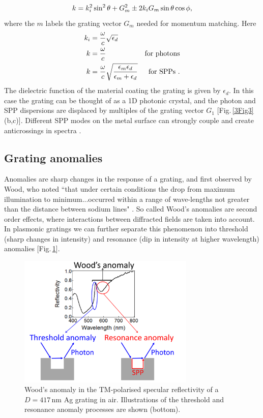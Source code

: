 \begin{equation}
\centering
k = k_i^2\sin^2\theta+G_m^2\pm2k_iG_m\sin\theta\cos\phi ,
\label{GratingDisp}
\end{equation}
where the $m$ labels the grating vector $G_m$ needed for momentum matching. Here
\begin{subequations}
\label{kmodes}
\begin{align}
\centering
k_i &= \frac{\omega}{c}\sqrt{\epsilon_d}& \\
k&=\frac{\omega}{c}& \textnormal{for photons} \label{kphot} \\
k &= \frac{\omega}{c}\sqrt{\frac{\epsilon_m\epsilon_d}{\epsilon_m+\epsilon_d}}& \textnormal{for SPPs .} \label{kspp}
\end{align}
\end{subequations}
The dielectric function of the material coating the grating is given by $\epsilon_d$. In this case the grating can be thought of as a 1D photonic crystal, and the photon and SPP dispersions are displaced by multiples of the grating vector $G_1$ [Fig.\,\ref{3Fig3}(b,c)]. Different SPP modes on the metal surface can strongly couple and create anticrossings in spectra \cite{Chen1983}.



\subsection{Grating anomalies}

Anomalies are sharp changes in the response of a grating, and first observed by Wood, who noted ``that under certain conditions the drop from maximum illumination to minimum...occurred within a range of wave-lengths not greater than the distance between sodium lines" \cite{Wood1902}. So called Wood's anomalies are second order effects, where interactions between diffracted fields are taken into account. In plasmonic gratings we can further separate this phenomenon into threshold (sharp changes in intensity) and resonance (dip in intensity at higher wavelength) anomalies [Fig.\,\ref{3Fig4}].
\begin{figure}[h!] 
\centering    
\includegraphics[width=0.75\textwidth]{Fig4}
\caption{Wood's anomaly in the TM-polarised specular reflectivity of a $D=417$\,nm Ag grating in air. Illustrations of the threshold and resonance anomaly processes are shown (bottom).}
\label{3Fig4}
\end{figure}

